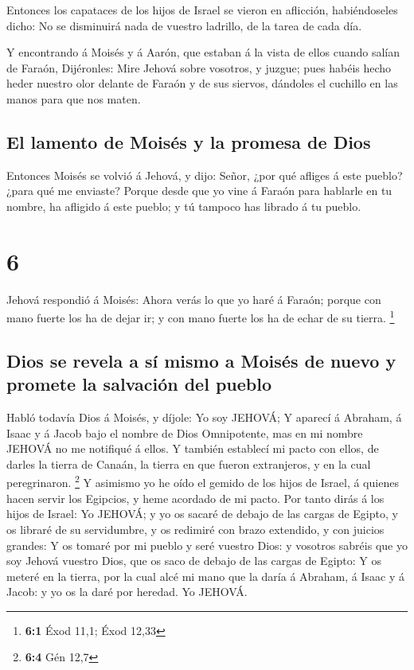  Entonces los capataces de los hijos de Israel se vieron en
aflicción, habiéndoseles dicho: No se disminuirá nada de vuestro
ladrillo, de la tarea de cada día.

 Y encontrando á Moisés y á Aarón, que estaban á la vista
de ellos cuando salían de Faraón,  Dijéronles: Mire Jehová
sobre vosotros, y juzgue; pues habéis hecho heder nuestro olor delante
de Faraón y de sus siervos, dándoles el cuchillo en las manos para que
nos maten.

\hypertarget{el-lamento-de-moisuxe9s-y-la-promesa-de-dios}{%
\subsection{El lamento de Moisés y la promesa de
Dios}\label{el-lamento-de-moisuxe9s-y-la-promesa-de-dios}}

 Entonces Moisés se volvió á Jehová, y dijo: Señor, ¿por
qué afliges á este pueblo? ¿para qué me enviaste?  Porque
desde que yo vine á Faraón para hablarle en tu nombre, ha afligido á
este pueblo; y tú tampoco has librado á tu pueblo.

\hypertarget{section-5}{%
\section{6}\label{section-5}}

 Jehová respondió á Moisés: Ahora verás lo que yo haré á
Faraón; porque con mano fuerte los ha de dejar ir; y con mano fuerte los
ha de echar de su tierra. \footnote{\textbf{6:1} Éxod 11,1; Éxod 12,33}

\hypertarget{dios-se-revela-a-suxed-mismo-a-moisuxe9s-de-nuevo-y-promete-la-salvaciuxf3n-del-pueblo}{%
\subsection{Dios se revela a sí mismo a Moisés de nuevo y promete la
salvación del
pueblo}\label{dios-se-revela-a-suxed-mismo-a-moisuxe9s-de-nuevo-y-promete-la-salvaciuxf3n-del-pueblo}}

 Habló todavía Dios á Moisés, y díjole: Yo soy JEHOVÁ;
 Y aparecí á Abraham, á Isaac y á Jacob bajo el nombre de
Dios Omnipotente, mas en mi nombre JEHOVÁ no me notifiqué á ellos.
 Y también establecí mi pacto con ellos, de darles la tierra
de Canaán, la tierra en que fueron extranjeros, y en la cual
peregrinaron. \footnote{\textbf{6:4} Gén 12,7}  Y asimismo
yo he oído el gemido de los hijos de Israel, á quienes hacen servir los
Egipcios, y heme acordado de mi pacto.  Por tanto dirás á
los hijos de Israel: Yo JEHOVÁ; y yo os sacaré de debajo de las cargas
de Egipto, y os libraré de su servidumbre, y os redimiré con brazo
extendido, y con juicios grandes:  Y os tomaré por mi pueblo
y seré vuestro Dios: y vosotros sabréis que yo soy Jehová vuestro Dios,
que os saco de debajo de las cargas de Egipto:  Y os meteré
en la tierra, por la cual alcé mi mano que la daría á Abraham, á Isaac y
á Jacob: y yo os la daré por heredad. Yo JEHOVÁ.


